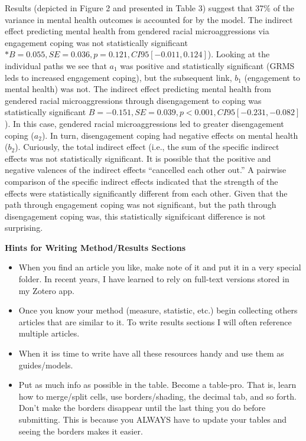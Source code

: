 \documentclass[
  11pt,
]{book}
\providecommand{\tightlist}{%
  \setlength{\itemsep}{0pt}\setlength{\parskip}{0pt}}
\begin{document}
Results (depicted in Figure 2 and presented in Table 3) suggest that 37\% of the variance in mental health outcomes is accounted for by the model. The indirect effect predicting mental health from gendered racial microaggressions via engagement coping was not statistically significant \(*B = 0.055, SE = 0.036, p = 0.121, CI95[-0.011, 0.124]\)). Looking at the individual paths we see that \(a_{1}\) was positive and statistically significant (GRMS leds to increased engagement coping), but the subsequent link, \(b_{1}\) (engagement to mental health) was not. The indirect effect predicting mental health from gendered racial microaggressions through disengagement to coping was statistically significant \(B = -0.151, SE = 0.039, p < 0.001, CI95[-0.231, -0.082]\)). In this case, gendered racial microaggressions led to greater disengagement coping (\(a_{2}\)). In turn, disengagement coping had negative effects on mental health (\(b_{2}\)). Curiously, the total indirect effect (i.e., the sum of the specific indirect effects was not statistically significant. It is possible that the positive and negative valences of the indirect effects ``cancelled each other out.'' A pairwise comparison of the specific indirect effects indicated that the strength of the effects were statistically significantly different from each other. Given that the path through engagement coping was not significant, but the path through disengagement coping was, this statistically signifcicant difference is not surprising.

\textbf{Hints for Writing Method/Results Sections}

\begin{itemize}
\tightlist
\item
  When you find an article you like, make note of it and put it in a very special folder. In recent years, I have learned to rely on full-text versions stored in my Zotero app.
\item
  Once you know your method (measure, statistic, etc.) begin collecting others articles that are similar to it. To write results sections I will often reference multiple articles.\\
\item
  When it iss time to write have all these resources handy and use them as guides/models.
\item
  Put as much info as possible in the table. Become a table-pro. That is, learn how to merge/split cells, use borders/shading, the decimal tab, and so forth. Don't make the borders disappear until the last thing you do before submitting. This is because you ALWAYS have to update your tables and seeing the borders makes it easier.
\end{itemize}
\end{document}
